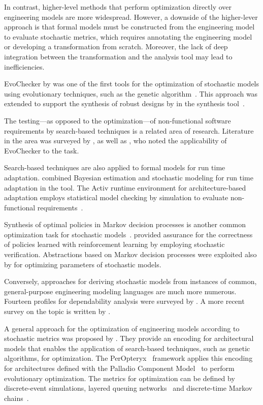 In contrast, higher-level methods that perform optimization directly over engineering models are more widespread. However, a downside of the higher-lever approach is that formal models must be constructed from the engineering model to evaluate stochastic metrics, which requires annotating the engineering model or developing a transformation from scratch. Moreover, the lack of deep integration between the transformation and the analysis tool may lead to inefficiencies.

EvoChecker by \citet{Gerasimou15evochecker} was one of the first tools for the optimization of stochastic models using evolutionary techniques, such as the  genetic algorithm~\citep{Deb02nsga}. This approach was extended to support the synthesis of robust designs by \citet{Calinescu17robust} in the  synthesis tool~\citep{Calinescu17rodes}.

The testing---as opposed to the optimization---of non-functional software requirements by search-based techniques is a related area of research. Literature in the area was surveyed by \citet{Afzal09testing}, as well as \citet{Parasa16testing}, who noted the applicability of EvoChecker to the task.

Search-based techniques are also applied to formal models for run time adaptation. \citet{Epifani09adaptation} combined Bayesian estimation and stochastic modeling for run time adaptation in the  tool. The Activ runtime environment for architecture-based adaptation employs statistical model checking by simulation to evaluate non-functional requirements~\citep{Iftikhar17activforms}.

Synthesis of optimal policies in Markov decision processes is another common optimization task for stochastic models~\citep{Baier17maximizing}. \citet{Mason17assurance} provided assurance for the correctness of policies learned with reinforcement learning by employing stochastic verification. Abstractions based on Markov decision processes were exploited also by \citet{Quatmann16mdp} for optimizing parameters of stochastic models. 

Conversely, approaches for deriving stochastic models from instances of common,  general-purpose engineering modeling languages are much more numerous. Fourteen  profiles for dependability analysis were surveyed by \citet{Bernardi08umlprofile}. A more recent survey on the topic is written by \citet{Koziolek10review}.

A general approach for the optimization of engineering models according to stochastic metrics was proposed by \citet{Koziolek11generic}. They provide an encoding for architectural models that enables the application of search-based techniques, such as genetic algorithms, for optimization. The PerOpteryx~\citep{Martens10evolutionary} framework applies this encoding for architectures defined with the Palladio Component Model~\citep{Becker08palladio} to perform evolutionary optimization. The metrics for optimization can be defined by discrete-event simulations, layered queuing networks~\citep{Franks09lqn} and discrete-time Markov chains~\citep{Koziolek09dependencies}.


